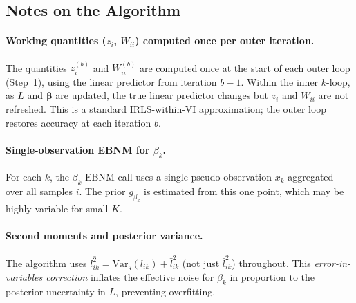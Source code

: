 \documentclass{article}[12pt]
\newcommand{\lbar}[2]{\bar{l}_{#1#2}}
\newcommand{\lsec}[2]{\overline{l^{2}_{#1#2}}}
\begin{document}
\bigskip

\subsection*{Notes on the Algorithm}

\paragraph{Working quantities ($z_i$, $W_{ii}$) computed once per outer iteration.}
The quantities $z_i^{(b)}$ and $W_{ii}^{(b)}$ are computed once at the start
of each outer loop (Step~1), using the linear predictor from iteration $b-1$.
Within the inner $k$-loop, as $\bar{L}$ and $\bar{\bm{\beta}}$ are updated,
the true linear predictor changes but $z_i$ and $W_{ii}$ are not refreshed.
This is a standard IRLS-within-VI approximation; the outer loop restores
accuracy at each iteration $b$.

\paragraph{Single-observation EBNM for $\beta_k$.}
For each $k$, the $\beta_k$ EBNM call uses a single pseudo-observation $x_k$
aggregated over all samples $i$. The prior $g_{\beta_k}$ is estimated from this
one point, which may be highly variable for small $K$.

\paragraph{Second moments and posterior variance.}
The algorithm uses $\lsec{i}{k} = \mathrm{Var}_q(l_{ik}) + \lbar{i}{k}^2$
(not just $\lbar{i}{k}^2$) throughout. This \emph{error-in-variables
correction} inflates the effective noise for $\beta_k$ in proportion to the
posterior uncertainty in $L$, preventing overfitting.

\end{document}
